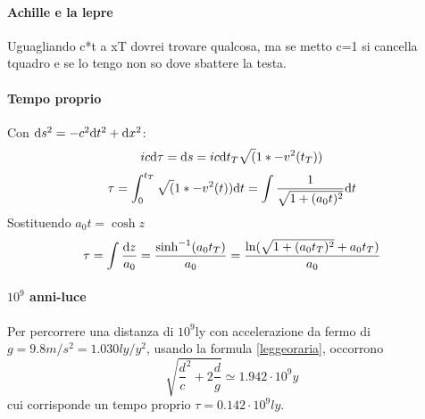 \paragraph {Achille e la lepre}
Uguagliando c*t a xT dovrei trovare qualcosa, ma se metto c=1 si cancella tquadro e se lo tengo non so dove sbattere la testa.

\paragraph {Tempo proprio}
Con \(\mathrm{d} s^2 = -c^2\mathrm{d} t^2 + \mathrm{d} x^2 \):
\[ ic\mathrm{d}\tau = \mathrm{d} s = ic\mathrm{d} t_T \sqrt(1*-v^2(t_T)) \]
\[ \tau = \int_0^{t_T} \sqrt(1*-v^2(t)) \mathrm{d} t = \int \frac{1}{\sqrt{1+(a_0t)^2}} \mathrm{d} t \]
Sostituendo \( a_0t = \cosh z \)
\[ \tau = \int \frac {\mathrm{d} z}{a_0} = \frac{\sinh^{-1}(a_0t_T)}{a_0} = \frac{\ln({\sqrt{1+(a_0t_T)^2}+a_0t_T)}}{a_0}\]

\paragraph {$10^9$ anni-luce}
Per percorrere una distanza di $10^9 \mathrm{ly}$ con accelerazione da fermo di \(g=9.8m/s^2=1.030ly/y^2\), usando la formula \ref{leggeoraria}, occorrono
\[ \sqrt{\frac{d}{c}^2 + 2\frac{d}{g}} \simeq 1.942\cdot10^9y \]
cui corrisponde un tempo proprio \( \tau = 0.142\cdot10^9ly \).
